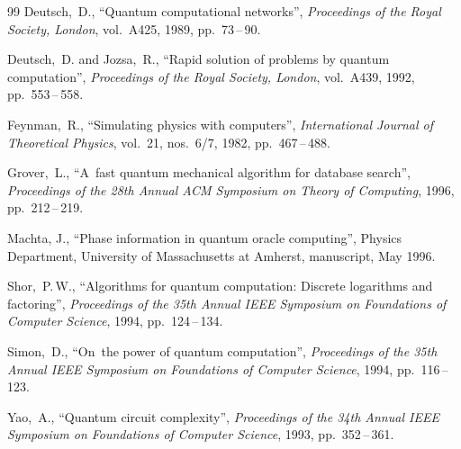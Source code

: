 \begin{thebibliography}{99}
Deutsch,~D., ``Quantum computational networks'',
{\em Proceedings of the Royal Society, London},
vol.~A425, 1989, pp.~73\,--\,90.
\suivant

Deutsch,~D. and Jozsa,~R.,
``Rapid solution of problems by quantum computation'',
{\em Proceedings of the Royal Society, London},
vol.~A439, 1992, \mbox{pp.~553\,--\,558}.
\suivant

Feynman,~R.,
``Simulating physics with computers'',
{\em International Journal of Theoretical Physics},
vol.~21, nos.~6/7, 1982, \mbox{pp.~467\,--\,488}.
\suivant

Grover,~L.,
``A~fast quantum mechanical algorithm for database search'',
{\em Proceedings of the 28th Annual ACM Symposium on Theory of Computing},
1996, pp.~212\,--\,219.
\suivant

Machta, J.,
``Phase information in quantum oracle computing'', Physics Department,
University of Massachusetts at Amherst, manuscript, May 1996.
\suivant

Shor,~P.\,W.,
``Algorithms for quantum computation: Discrete logarithms
and \mbox{factoring}'',
{\em Proceedings of the 35th Annual IEEE Symposium on
Foundations of \mbox{Computer} Science},
1994, \mbox{pp.~124\,--\,134}.
\suivant

Simon,~D.,
``On~the power of quantum computation'',
{\em Proceedings of the 35th Annual IEEE Symposium on
Foundations of Computer Science},
1994, \mbox{pp.~116\,--\,123}.
\suivant

Yao,~A.,
``Quantum circuit complexity'',
{\em Proceedings of the 34th Annual IEEE Symposium on
Foundations of Computer Science},
1993, pp.~352\,--\,361.
\suivant

\end{thebibliography}



